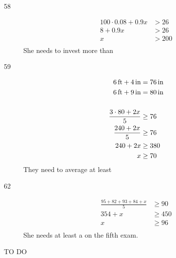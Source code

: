 \documentclass[letterpaper, landscape]{exam}
\begin{document}
\begin{description}
      \item[58]
        \begin{align*}
          100 \cdot 0.08 + 0.9x & > 26 \\
          8 + 0.9x              & > 26 \\
          x                     & > 200 \\
        \end{align*}
        She needs to invest more than 

      \item[59]
        \begin{align*}
          \unit[6]{ft} + \unit[4]{in} &= \unit[76]{in} \\
          \unit[6]{ft} + \unit[9]{in} &= \unit[80]{in} \\
          \\
          \frac{3 \cdot 80 + 2x}{5} & \geq 76 \\
          \frac{240 + 2x}{5}        & \geq 76 \\
          240 + 2x                  & \geq 380 \\
          x                         & \geq 70 \\
        \end{align*}
        They need to average at least 

      \item[62]
        \begin{align*}
          \frac{95 + 82 + 93 + 84 + x}{5} & \geq 90 \\
          354 + x                         & \geq 450 \\
          x                               & \geq 96 \\
        \end{align*}
        She needs at least a  on the fifth exam.
        
    \end{description}

  \fi

  \ifprintanswers{}
  \else
    \vspace{5 in}

    TO DO
  \fi
\end{document}
